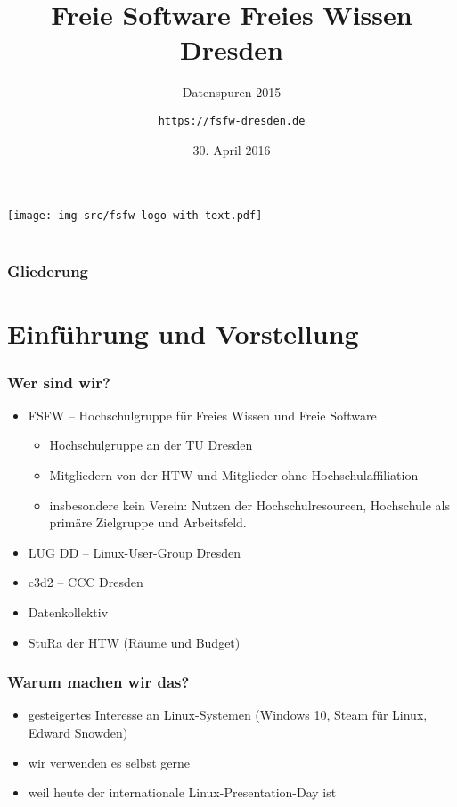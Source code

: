 \documentclass[t]{beamer}
\title{Freie Software Freies Wissen Dresden}
\subtitle{Datenspuren 2015}
\author{\texttt{https://fsfw-dresden.de}}
\date[30.04.2016]{30. April 2016}
\begin{document}
\begin{frame}
  \begin{center}%
\texttt{[image: img-src/fsfw-logo-with-text.pdf]}\\%
\vspace*{-1em}{Freie Software Freies Wissen}\\[1em]
  \end{center}
\end{frame}

\begin{frame}
  \frametitle{Gliederung}
  \tableofcontents
\end{frame}

\section{Einführung und Vorstellung}
\begin{frame}
  \frametitle{Wer sind wir?}
  \begin{itemize}
  \item FSFW – Hochschulgruppe für Freies Wissen und Freie Software
    \begin{itemize}
    \item Hochschulgruppe an der TU Dresden
    \item Mitgliedern von der HTW und Mitglieder ohne
      Hochschulaffiliation
    \item insbesondere kein Verein: Nutzen der Hochschulresourcen,
      Hochschule als primäre Zielgruppe und Arbeitsfeld.
    \end{itemize}
  \item LUG DD – Linux-User-Group Dresden
  \item c3d2 – CCC Dresden
  \item Datenkollektiv
  \item StuRa der HTW (Räume und Budget)
  \end{itemize}
\end{frame}

\begin{frame}
  \frametitle{Warum machen wir das?}
  \begin{itemize}
  \item gesteigertes Interesse an Linux-Systemen (Windows 10, Steam
    für Linux, Edward Snowden)
  \item wir verwenden es selbst gerne
  \item weil heute der internationale Linux-Presentation-Day ist
  \end{itemize}
\end{frame}
\end{document}
